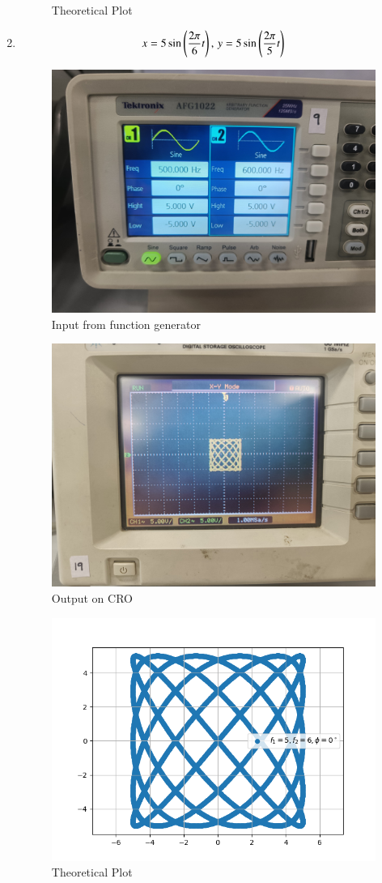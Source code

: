 \documentclass[journal]{IEEEtran}
\begin{document}
\begin{enumerate}
\begin{figure}[H]
        \caption{Theoretical Plot}
    \end{figure}
    \item \begin{align}
        x = 5\sin\left(\frac{2\pi}{6}t\right),\,y = 5\sin\left(\frac{2\pi}{5}t\right)
    \end{align}
    \begin{figure}[H]
        \centering
        \includegraphics[width=0.7\columnwidth]{pics/WhatsApp Image 2025-01-24 at 11.02.11(1).jpeg}
        \caption{Input from function generator}
    \end{figure}
    \begin{figure}[H]
        \centering
        \includegraphics[width=0.7\columnwidth]{pics/WhatsApp Image 2025-01-24 at 11.02.11.jpeg}
        \caption{Output on CRO}
    \end{figure}
    \begin{figure}[H]
        \centering
        \includegraphics[width=0.7\columnwidth]{figs/fig8.png}
        \caption{Theoretical Plot}
    \end{figure}
\end{enumerate}
\end{document}
